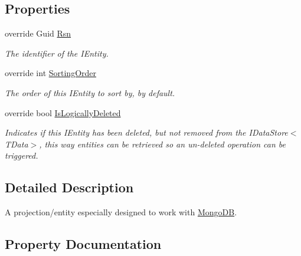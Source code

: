 \subsection*{Properties}
\begin{DoxyCompactItemize}
\item 
override Guid \hyperlink{classCqrs_1_1MongoDB_1_1Entities_1_1MongoEntity_acc0c0c4d927e9abfe88415cababff6b5_acc0c0c4d927e9abfe88415cababff6b5}{Rsn}
\begin{DoxyCompactList}\small\item\em The identifier of the I\+Entity. \end{DoxyCompactList}\item 
override int \hyperlink{classCqrs_1_1MongoDB_1_1Entities_1_1MongoEntity_a3d5f7476fc2de3b9061ea3e76e77e0cb_a3d5f7476fc2de3b9061ea3e76e77e0cb}{Sorting\+Order}
\begin{DoxyCompactList}\small\item\em The order of this I\+Entity to sort by, by default. \end{DoxyCompactList}\item 
override bool \hyperlink{classCqrs_1_1MongoDB_1_1Entities_1_1MongoEntity_a763ab3fddd6f7d07e907c274bea305f5_a763ab3fddd6f7d07e907c274bea305f5}{Is\+Logically\+Deleted}
\begin{DoxyCompactList}\small\item\em Indicates if this I\+Entity has been deleted, but not removed from the I\+Data\+Store$<$\+T\+Data$>$, this way entities can be retrieved so an un-\/deleted operation can be triggered. \end{DoxyCompactList}\end{DoxyCompactItemize}


\subsection{Detailed Description}
A projection/entity especially designed to work with \hyperlink{namespaceCqrs_1_1MongoDB}{Mongo\+DB}. 



\subsection{Property Documentation}
\mbox{\label{classCqrs_1_1MongoDB_1_1Entities_1_1MongoEntity_a763ab3fddd6f7d07e907c274bea305f5_a763ab3fddd6f7d07e907c274bea305f5}} 
